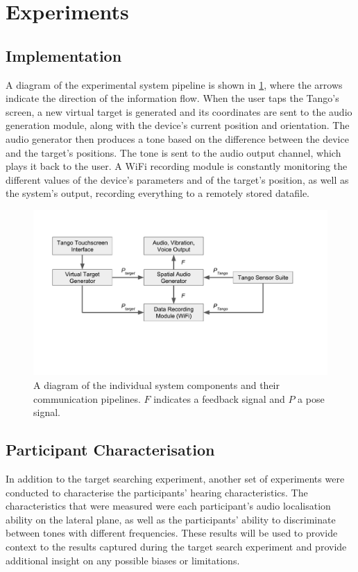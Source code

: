\documentclass{article}
\begin{document}
\section{Experiments}\label{sec:experiments}

\subsection{Implementation}

A diagram of the experimental system pipeline is shown in \cref{fig:pipeline}, where the arrows indicate the direction of the information flow.
When the user taps the Tango's screen, a new virtual target is generated and its coordinates are sent to the audio generation module, along with the device's current position and orientation.
The audio generator then produces a tone based on the difference between the device and the target's positions. The tone is sent to the audio output channel, which plays it back to the user.
A WiFi recording module is constantly monitoring the different values of the device's parameters and of the target's position, as well as the system's output, recording everything to a remotely stored datafile. 

\begin{figure}[t]
  \centering
  \includegraphics[clip=true, trim=0 120 80 50, width=0.9\columnwidth]{figures/pipeline.pdf}
  \caption{A diagram of the individual system components and their communication pipelines. $F$ indicates a feedback signal and $P$ a pose signal. }\label{fig:pipeline}
\end{figure}

\subsection{Participant Characterisation}

In addition to the target searching experiment, another set of experiments were conducted to characterise the participants' hearing characteristics.
The characteristics that were measured were each participant's audio localisation ability on the lateral plane, as well as the participants' ability to discriminate between tones with different frequencies. 
These results will be used to provide context to the results captured during the target search experiment and provide additional insight on any possible biases or limitations. 
\end{document}
